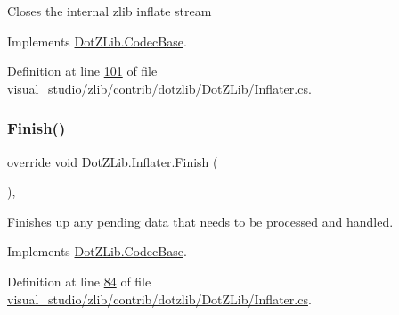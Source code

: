 Closes the internal zlib inflate stream 



Implements \hyperlink{class_dot_z_lib_1_1_codec_base_aa0ded075105c5cf6f5f0d61928c90ca6}{Dot\+Z\+Lib.\+Codec\+Base}.



Definition at line \hyperlink{visual__studio_2zlib_2contrib_2dotzlib_2_dot_z_lib_2_inflater_8cs_source_l00101}{101} of file \hyperlink{visual__studio_2zlib_2contrib_2dotzlib_2_dot_z_lib_2_inflater_8cs_source}{visual\+\_\+studio/zlib/contrib/dotzlib/\+Dot\+Z\+Lib/\+Inflater.\+cs}.

\mbox{\label{class_dot_z_lib_1_1_inflater_aa70c9d026f5d1b44fe0679b78973285c}} 
\subsubsection{\texorpdfstring{Finish()}{Finish()}\hspace{0.1cm}{\footnotesize\ttfamily [1/2]}}
{\footnotesize\ttfamily override void Dot\+Z\+Lib.\+Inflater.\+Finish (\begin{DoxyParamCaption}{ }\end{DoxyParamCaption})\hspace{0.3cm}{\ttfamily [inline]}, {\ttfamily [virtual]}}



Finishes up any pending data that needs to be processed and handled. 



Implements \hyperlink{class_dot_z_lib_1_1_codec_base_abab96cb01a9b983452a31777e3a1e633}{Dot\+Z\+Lib.\+Codec\+Base}.



Definition at line \hyperlink{visual__studio_2zlib_2contrib_2dotzlib_2_dot_z_lib_2_inflater_8cs_source_l00084}{84} of file \hyperlink{visual__studio_2zlib_2contrib_2dotzlib_2_dot_z_lib_2_inflater_8cs_source}{visual\+\_\+studio/zlib/contrib/dotzlib/\+Dot\+Z\+Lib/\+Inflater.\+cs}.

\mbox{\label{class_dot_z_lib_1_1_inflater_aa70c9d026f5d1b44fe0679b78973285c}} 
